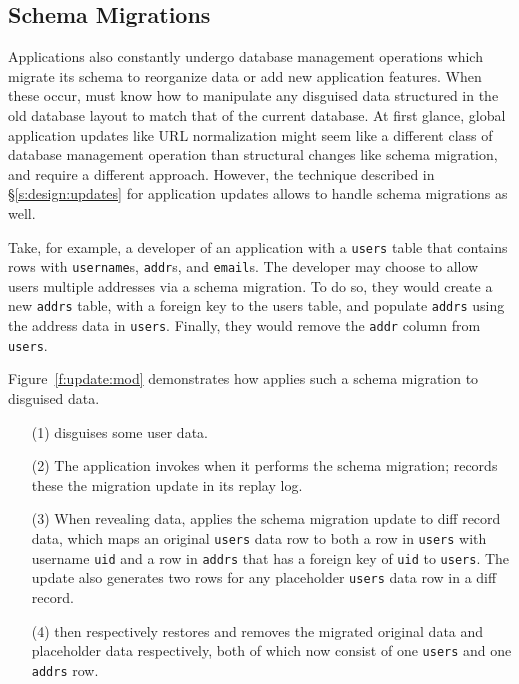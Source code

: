 \subsection{Schema Migrations}
%
Applications also constantly undergo database management operations which
migrate its schema to reorganize data or add new application features. When
these occur, \sys must know how to manipulate any disguised data structured in
the old database layout to match that of the current database.
%
At first glance, global application updates like URL normalization might seem
like a different class of database management operation than structural changes
like schema migration, and require a different approach.
%
However, the technique described in \S\ref{s:design:updates} for application updates allows \sys to
handle schema migrations as well. 
%

%
Take, for example, a developer of an application with a \texttt{users} table
that contains rows with \texttt{username}s, \texttt{addr}s, and \texttt{email}s.
The developer may choose to allow users multiple addresses via a schema
migration. To do so, they would create a new \texttt{addrs} table, with a
foreign key to the users table, and populate \texttt{addrs} using the address
data in \texttt{users}.  Finally, they would remove the \texttt{addr} column
from \texttt{users}.
%

Figure~\ref{f:update:mod} demonstrates how \sys applies such a schema migration to
disguised data.
\begin{enumerate}[nosep]
    \item[(1)] \sys disguises some user data.
    \item[(2)] The application invokes \sys when it
performs the schema migration; \sys records these the migration update in its replay log.
    \item[(3)] When revealing data, \sys applies the schema migration update to
        diff record data, which maps an original \texttt{users} data row to both
    a row in \texttt{users} with username \texttt{uid} and a row in
\texttt{addrs} that has a foreign key of \texttt{uid} to \texttt{users}.
%
The update also generates two rows for any placeholder \texttt{users}
data row in a diff record.
%
\item[(4)] \sys then respectively restores and removes the migrated original data and placeholder
        data respectively, both of which now consist of one \texttt{users} and
        one \texttt{addrs} row.
\end{enumerate}


